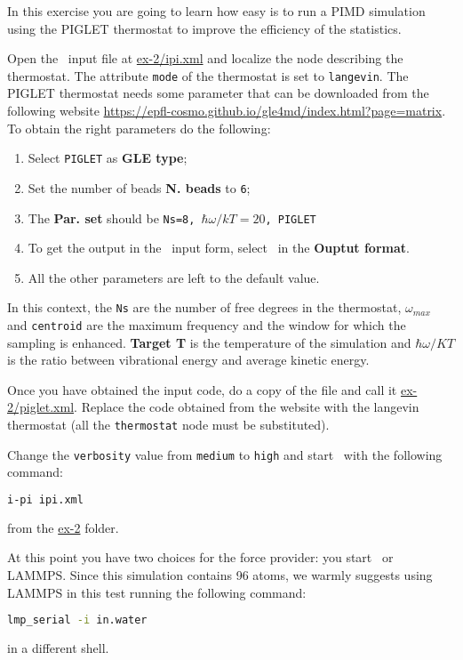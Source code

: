\documentclass{article}
\begin{document}
\begin{Exercise}[label={inputs},title={Liquid water with the
    \emph{PIGLET} thermostat}]
In this exercise you are going to learn how easy is to run a PIMD
simulation using the PIGLET thermostat to improve the efficiency of
the statistics.

\Question
Open the \ipi\ input file at \url{ex-2/ipi.xml} and localize the node
describing the thermostat. The attribute \texttt{mode} of the
thermostat is set to \texttt{langevin}. The PIGLET thermostat needs
some parameter that can be downloaded from the following website
\url{https://epfl-cosmo.github.io/gle4md/index.html?page=matrix}. 
To obtain the right parameters do the following:
\begin{enumerate}
\item Select \texttt{PIGLET} as \textbf{GLE type};
\item Set the number of beads \textbf{N. beads} to \texttt{6};
\item The \textbf{Par. set} should be \texttt{Ns=8,
    $\hbar\omega/kT=20$, PIGLET}
\item To get the output in the \ipi\ input form, select \ipi\ in the
  \textbf{Ouptut format}.
\item All the other parameters are left to the default value.
\end{enumerate}
In this context, the \texttt{Ns} are the number of free degrees in the
thermostat, $\omega_{max}$ and \texttt{centroid} are the maximum
frequency and the window for which the sampling is
enhanced. \textbf{Target T} is the temperature of the simulation and
$\hbar\omega/KT$ is the ratio between vibrational energy and average
kinetic energy.

Once you have obtained the input code, do a copy of the file and call
it \url{ex-2/piglet.xml}. Replace the code obtained from the website
with the langevin thermostat (all the \texttt{thermostat} node must be
substituted).

\Question
Change the \texttt{verbosity} value from \texttt{medium} to
\texttt{high} and start \ipi\ with the following command:
\begin{lstlisting}[language=bash]
i-pi ipi.xml
\end{lstlisting}
from the \url{ex-2} folder. 

At this point you have two choices for the force provider: you start
\PWscf\ or LAMMPS. Since this simulation contains 96 atoms, we warmly
suggests using LAMMPS in this test running the following command:
\begin{lstlisting}[language=bash]
lmp_serial -i in.water 
\end{lstlisting}
in a different shell.


\end{Exercise}
\end{document}
